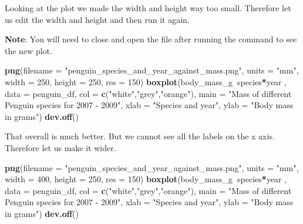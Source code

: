 \documentclass[]{book}
\newenvironment{Shaded}{\begin{snugshade}}{\end{snugshade}}
\newcommand{\KeywordTok}[1]{\textcolor[rgb]{0.13,0.29,0.53}{\textbf{#1}}}
\newcommand{\DataTypeTok}[1]{\textcolor[rgb]{0.13,0.29,0.53}{#1}}
\newcommand{\DecValTok}[1]{\textcolor[rgb]{0.00,0.00,0.81}{#1}}
\newcommand{\StringTok}[1]{\textcolor[rgb]{0.31,0.60,0.02}{#1}}
\newcommand{\OperatorTok}[1]{\textcolor[rgb]{0.81,0.36,0.00}{\textbf{#1}}}
\newcommand{\NormalTok}[1]{#1}
\begin{document}
Looking at the plot we made the width and height way too small.
Therefore let us edit the width and height and then run it again.

\textbf{Note}: You will need to close and open the file after running
the command to see the new plot.

\begin{Shaded}
\begin{Highlighting}[]
\KeywordTok{png}\NormalTok{(}\DataTypeTok{filename =} \StringTok{"penguin_species_and_year_against_mass.png"}\NormalTok{,}
    \DataTypeTok{units =} \StringTok{"mm"}\NormalTok{, }\DataTypeTok{width =} \DecValTok{250}\NormalTok{, }\DataTypeTok{height =} \DecValTok{250}\NormalTok{, }\DataTypeTok{res =} \DecValTok{150}\NormalTok{)}
\KeywordTok{boxplot}\NormalTok{(body_mass_g}\OperatorTok{~}\NormalTok{species}\OperatorTok{*}\NormalTok{year , }
        \DataTypeTok{data =}\NormalTok{ penguin_df, }
        \DataTypeTok{col =} \KeywordTok{c}\NormalTok{(}\StringTok{"white"}\NormalTok{,}\StringTok{"grey"}\NormalTok{,}\StringTok{"orange"}\NormalTok{),}
        \DataTypeTok{main =} \StringTok{"Mass of different Penguin species for 2007 - 2009"}\NormalTok{,}
        \DataTypeTok{xlab =} \StringTok{"Species and year"}\NormalTok{,}
        \DataTypeTok{ylab =} \StringTok{"Body mass in grams"}\NormalTok{)}
\KeywordTok{dev.off}\NormalTok{()}
\end{Highlighting}
\end{Shaded}

That overall is much better. But we cannot see all the labels on the x
axis. Therefore let us make it wider.

\begin{Shaded}
\begin{Highlighting}[]
\KeywordTok{png}\NormalTok{(}\DataTypeTok{filename =} \StringTok{"penguin_species_and_year_against_mass.png"}\NormalTok{,}
    \DataTypeTok{units =} \StringTok{"mm"}\NormalTok{, }\DataTypeTok{width =} \DecValTok{400}\NormalTok{, }\DataTypeTok{height =} \DecValTok{250}\NormalTok{, }\DataTypeTok{res =} \DecValTok{150}\NormalTok{)}
\KeywordTok{boxplot}\NormalTok{(body_mass_g}\OperatorTok{~}\NormalTok{species}\OperatorTok{*}\NormalTok{year , }
        \DataTypeTok{data =}\NormalTok{ penguin_df, }
        \DataTypeTok{col =} \KeywordTok{c}\NormalTok{(}\StringTok{"white"}\NormalTok{,}\StringTok{"grey"}\NormalTok{,}\StringTok{"orange"}\NormalTok{),}
        \DataTypeTok{main =} \StringTok{"Mass of different Penguin species for 2007 - 2009"}\NormalTok{,}
        \DataTypeTok{xlab =} \StringTok{"Species and year"}\NormalTok{,}
        \DataTypeTok{ylab =} \StringTok{"Body mass in grams"}\NormalTok{)}
\KeywordTok{dev.off}\NormalTok{()}
\end{Highlighting}
\end{Shaded}
\end{document}
